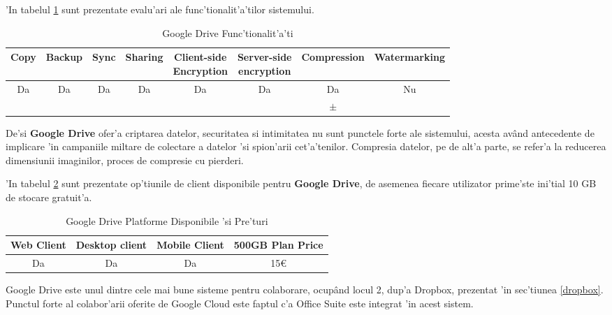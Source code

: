 \documentclass[12pt,a4paper,twoside]{report}
\newcommand{\greencheck}{\color{green}  \ding{51}}
\newcommand{\orangepm}{\color{orange} \textbf{$\pm$}}
\newcommand{\redxmark}{\color{red} \ding{55}}
\begin{document}
'In tabelul \ref{table:googledrivefeaturetable} sunt prezentate evalu'ari ale func'tionalit'a'tilor sistemului.
\begin{table}[H]
\small
\centering
\caption{Google Drive Func'tionalit'a'ti}
\begin{tabular}{|c|c|c|c|c|c|c|c|}          
\hline               
Copy & Backup & Sync & Sharing & \makecell{Client-side\\ Encryption} & \makecell{Server-side \\ encryption} & Compression & Watermarking \\ [0.5ex]   
\hline 
Da & Da & Da & Da & Da & Da & Da & Nu    \\                      
\greencheck & \greencheck\greencheck & \greencheck & \greencheck & \greencheck\greencheck & \greencheck &  \orangepm &  \redxmark\redxmark  \\               
\hline                              
\end{tabular}
\label{table:googledrivefeaturetable}      
\end{table}

De'si \textbf{Google Drive} ofer'a criptarea datelor, securitatea si intimitatea nu sunt punctele forte ale sistemului, acesta având antecedente de implicare 'in campaniile miltare de colectare a datelor 'si spion'arii cet'a'tenilor.  Compresia datelor, pe de alt'a parte, se refer'a la reducerea dimensiunii imaginilor, proces de compresie cu pierderi.

'In tabelul \ref{table:googledrivesystemtable} sunt prezentate op'tiunile de client disponibile pentru \textbf{Google Drive}, de asemenea fiecare utilizator prime'ste ini'tial 10 GB de stocare gratuit'a.
\begin{table}[H]
\centering
\caption{Google Drive Platforme Disponibile 'si Pre'turi}
\begin{tabular}{|c|c|c|c|}          
\hline                      
 Web Client & Desktop client & Mobile Client & 500GB Plan Price\\ [0.5ex]   
\hline                            
Da & Da & Da & 15\euro \\               
\hline                              
\end{tabular}
\label{table:googledrivesystemtable}             
\end{table}

Google Drive este unul dintre cele mai bune sisteme pentru colaborare, ocupând locul 2, dup'a Dropbox, prezentat 'in sec'tiunea \ref{dropbox}. Punctul forte al colabor'arii oferite de Google Cloud este faptul c'a Office Suite este integrat 'in acest sistem. 
\end{document}
